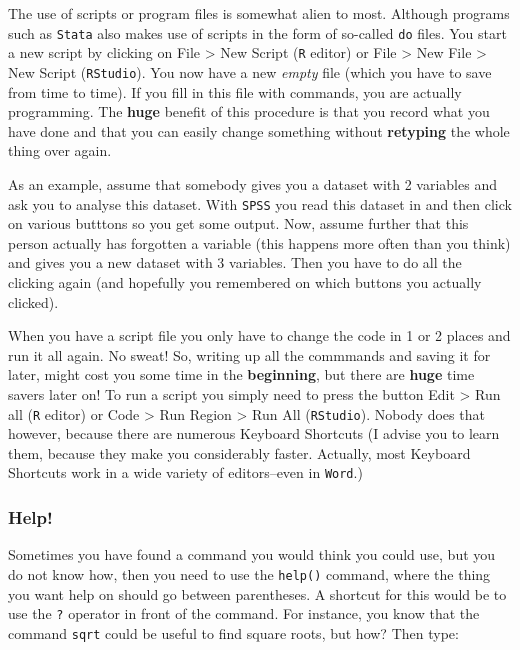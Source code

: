 \documentclass[]{article}
\theoremstyle{definition}
\theoremstyle{definition}
\theoremstyle{definition}
\theoremstyle{remark}
\begin{document}
The use of scripts or program files is somewhat alien to most. Although
programs such as \texttt{Stata} also makes use of scripts in the form of
so-called \texttt{do} files. You start a new script by clicking on File
\textgreater{} New Script (\texttt{R} editor) or File \textgreater{} New
File \textgreater{} New Script (\texttt{RStudio}). You now have a new
\emph{empty} file (which you have to save from time to time). If you
fill in this file with commands, you are actually programming. The
\textbf{huge} benefit of this procedure is that you record what you have
done and that you can easily change something without \textbf{retyping}
the whole thing over again.

As an example, assume that somebody gives you a dataset with 2 variables
and ask you to analyse this dataset. With \texttt{SPSS} you read this
dataset in and then click on various butttons so you get some output.
Now, assume further that this person actually has forgotten a variable
(this happens more often than you think) and gives you a new dataset
with 3 variables. Then you have to do all the clicking again (and
hopefully you remembered on which buttons you actually clicked).

When you have a script file you only have to change the code in 1 or 2
places and run it all again. No sweat! So, writing up all the commmands
and saving it for later, might cost you some time in the
\textbf{beginning}, but there are \textbf{huge} time savers later on! To
run a script you simply need to press the button Edit \textgreater{} Run
all (\texttt{R} editor) or Code \textgreater{} Run Region \textgreater{}
Run All (\texttt{RStudio}). Nobody does that however, because there are
numerous Keyboard Shortcuts (I advise you to learn them, because they
make you considerably faster. Actually, most Keyboard Shortcuts work in
a wide variety of editors--even in \texttt{Word}.)

\subsubsection{Help!}\label{help}

Sometimes you have found a command you would think you could use, but
you do not know how, then you need to use the \texttt{help()} command,
where the thing you want help on should go between parentheses. A
shortcut for this would be to use the \texttt{?} operator in front of
the command. For instance, you know that the command \texttt{sqrt} could
be useful to find square roots, but how? Then type:
\end{document}
